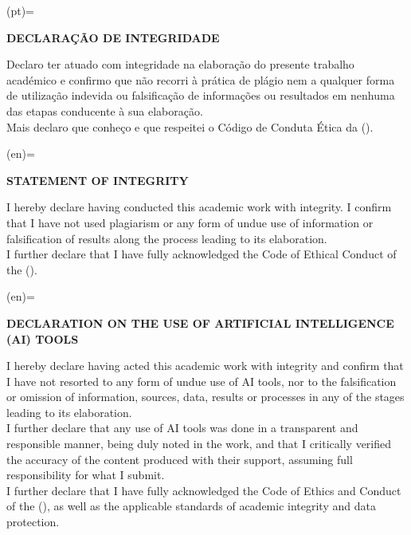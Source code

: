 
%

\makeatletter



\SetStatementOfIntegrityTextStr(pt)={%
  \begin{center}%
    \textbf{DECLARAÇÃO DE INTEGRIDADE}%
  \end{center}%
  \indent Declaro ter atuado com integridade na elaboração do presente trabalho académico e confirmo que não recorri à prática de plágio nem a qualquer forma de utilização indevida ou falsificação de informações ou resultados em nenhuma das etapas conducente à sua elaboração.\\[1ex]
  \indent Mais declaro que conheço e que respeitei o Código de Conduta Ética da \GetUniversity(\@LANG@MAIN).
}

\SetStatementOfIntegrityTextStr(en)={%
  \begin{center}%
    \textbf{STATEMENT OF INTEGRITY}%
  \end{center}%
  \indent I hereby declare having conducted this academic work with integrity. I confirm that I have not used plagiarism or any form of undue use of information or falsification of results along the process leading to its elaboration.\\[1ex]
  \indent I further declare that I have fully acknowledged the Code of Ethical Conduct of the \GetUniversity(\@LANG@MAIN).
}


\SetStatementOfAIUsage(en)={%
  \begin{center}%
    \textbf{DECLARATION ON THE USE OF ARTIFICIAL INTELLIGENCE (AI) TOOLS}%
  \end{center}%
    \indent I hereby declare having acted this academic work with integrity and confirm that I have not resorted to any form of undue use of AI tools, nor to the falsification or omission of information, sources, data, results or processes in any of the stages leading to its elaboration.\\[1ex]
    \indent I further declare that any use of AI tools was done in a transparent and responsible manner, being duly noted in the work, and that I critically verified the accuracy of the content produced with their support, assuming full responsibility for what I submit.\\[1ex]
    \indent I further declare that I have fully acknowledged the Code of Ethics and Conduct of the \GetUniversity(\@LANG@MAIN), as well as the applicable standards of academic integrity and data protection.
}

